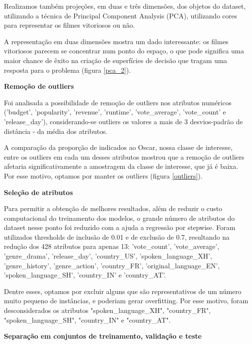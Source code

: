         Realizamos também projeções, em duas e três dimensões, dos objetos do dataset, utilizando a técnica de Principal Component Analysis (PCA), utilizando cores para representar os filmes vitoriosos ou não.
        
        A representação em duas dimensões mostra um dado interessante: os filmes vitoriosos parecem se concentrar num ponto do espaço, o que pode significa uma maior chance de êxito na criação de superfícies de decisão que tragam uma resposta para o problema (figura \ref{pca_2}).
        
        \textbf{Remoção de outliers}\par
        Foi analisada a possibilidade de remoção de outliers nos atributos numéricos ('budget', 'popularity', 'revenue', 'runtime', 'vote\_average', 'vote\_count' e 'release\_day'), considerando-se outliers os valores a mais de 3 desvios-padrão de distância - da média dos atributos.\par
        
        A comparação da proporção de indicados ao Oscar, nossa classe de interesse, entre os outliers em cada um desses atributos mostrou que a remoção de outliers afetaria significativamente a amostragem da classe de interesse, que já é baixa. Por esse motivo, optamos por manter os outliers (figura \ref{outliers}).

        \textbf{Seleção de atributos}\par
        
        Para permitir a obtenção de melhores resultados, além de reduzir o custo computacional do treinamento dos modelos, o grande número de atributos do dataset nesse ponto foi reduzido com a ajuda a regressão por stepwise. Foram utilizados thresholds de inclusão de 0.01 e de exclusão de 0.7, resultando na redução dos 428 atributos para apenas 13: 'vote\_count', 'vote\_average', 'genre\_drama', 'release\_day', 'country\_US', 'spoken\_language\_XH', 'genre\_history', 'genre\_action', 'country\_FR', 'original\_language\_EN', 'spoken\_language\_SH', 'country\_IN' e 'country\_AT'.
        
        Dentre esses, optamos por excluir alguns que são representativos de um número muito pequeno de instâncias, e poderiam gerar overfitting. Por esse motivo, foram desconsiderados os atributos "spoken\_language\_XH", "country\_FR", "spoken\_language\_SH", "country\_IN" e "country\_AT".\newline

        \textbf{Separação em conjuntos de treinamento, validação e teste}\par
        
